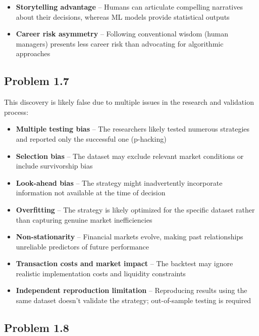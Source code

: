 \documentclass{article}
\begin{document}
\begin{sloppypar}
\begin{itemize}
    \item \textbf{Storytelling advantage} -- Humans can articulate compelling narratives about their decisions, whereas ML models provide statistical outputs
    
    \item \textbf{Career risk asymmetry} -- Following conventional wisdom (human managers) presents less career risk than advocating for algorithmic approaches
\end{itemize}

\subsection{Problem 1.7}
This discovery is likely false due to multiple issues in the research and validation process:

\begin{itemize}
    \item \textbf{Multiple testing bias} -- The researchers likely tested numerous strategies and reported only the successful one (p-hacking)
    
    \item \textbf{Selection bias} -- The dataset may exclude relevant market conditions or include survivorship bias
    
    \item \textbf{Look-ahead bias} -- The strategy might inadvertently incorporate information not available at the time of decision
    
    \item \textbf{Overfitting} -- The strategy is likely optimized for the specific dataset rather than capturing genuine market inefficiencies
    
    \item \textbf{Non-stationarity} -- Financial markets evolve, making past relationships unreliable predictors of future performance
    
    \item \textbf{Transaction costs and market impact} -- The backtest may ignore realistic implementation costs and liquidity constraints
    
    \item \textbf{Independent reproduction limitation} -- Reproducing results using the same dataset doesn't validate the strategy; out-of-sample testing is required
\end{itemize}

\subsection{Problem 1.8}


\end{sloppypar}
\end{document}
